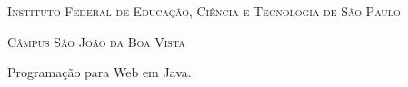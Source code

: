 \begin{titlingpage}
    
    
    \center
    
    \noindent
    \chaptitlefont\large\textsc{Instituto Federal de Educação, Ciência e Tecnologia de São Paulo}
    \vspace{0.5cm}
    
    \noindent    
    \chaptitlefont\large\textsc{Câmpus São João da Boa Vista}
    \vspace{2.5cm}
    
    \noindent
    \chaptitlefont\Large\textsc{\theauthor}
    \vspace{2.5cm}
    
    \noindent
    \chaptitlefont\HUGE\textsc{\thetitle}
    \vspace{1.5cm}
    
    \hspace{.4\textwidth}
        \begin{flushright}
            \begin{minipage}{.5\textwidth}
                \SingleSpacing
                \large Programação para Web em Java.
            \end{minipage}%
        \end{flushright}
    
    \vspace*{\fill}
        
    \noindent
    \large\textsc{\thedate}
    
    \restoregeometry
    
\end{titlingpage}